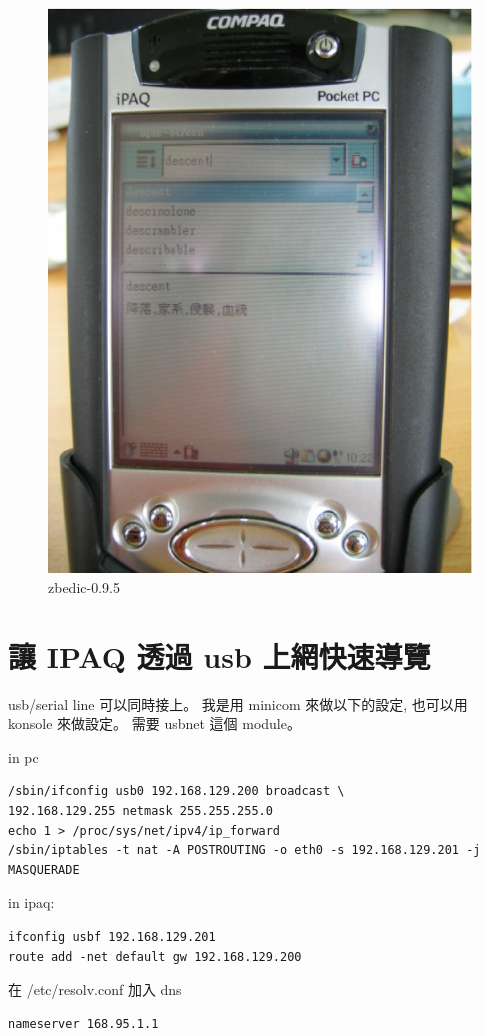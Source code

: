 \documentclass[12pt,a4paper]{article}
\begin{document}
\begin{CJK}{UTF8}{bsmi}
\begin{figure}[htbp]
\centering
\includegraphics[scale=0.3]{eps/zbedic-0.9.5.eps}
\caption{zbedic-0.9.5}
\end{figure}

\section{讓 IPAQ 透過 usb 上網快速導覽}
usb/serial line 可以同時接上。
我是用 minicom 來做以下的設定,
也可以用 konsole 來做設定。
需要 usbnet 這個 module。

in pc

\begin{verbatim}
/sbin/ifconfig usb0 192.168.129.200 broadcast \
192.168.129.255 netmask 255.255.255.0
echo 1 > /proc/sys/net/ipv4/ip_forward
/sbin/iptables -t nat -A POSTROUTING -o eth0 -s 192.168.129.201 -j MASQUERADE
\end{verbatim}

\noindent
in ipaq:
\begin{verbatim}
ifconfig usbf 192.168.129.201
route add -net default gw 192.168.129.200
\end{verbatim}
在 /etc/resolv.conf 加入 dns
\begin{verbatim}
nameserver 168.95.1.1
\end{verbatim}




\end{CJK}
\end{document}
